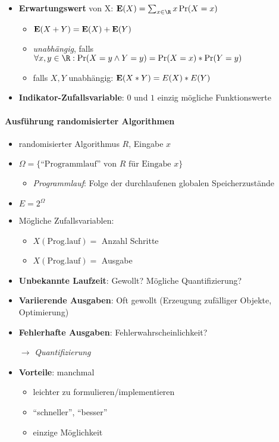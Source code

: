 \begin{itemize}
  \item \textbf{Erwartungswert} von X: $ \E(X) = \sum_{x \in \R}x\Pr(X = x) $
  \begin{itemize}
    \item $ \text{\textbf{E}}(X + Y) = \text{\textbf{E}}(X) + \text{\textbf{E}}(Y) $
    \item \emph{unabhängig}, falls $ \forall x, y \in \R : \Pr(X = y \wedge Y = y) = \Pr(X = x) * \Pr(Y = y) $
    \item falls $ X, Y $ unabhängig: $ \text{\textbf{E}}(X * Y) = E(X) * E(Y) $
  \end{itemize}
  \item \textbf{Indikator-Zufallsvariable}: $ 0 $ und $ 1 $ einzig mögliche Funktionswerte
\end{itemize}

\paragraph{Ausführung randomisierter Algorithmen}
\begin{itemize}
  \item randomisierter Algorithmus $ R $, Eingabe $ x $
  \item $ \Omega = \{ \text{``Programmlauf'' von } R \text{ für Eingabe } x \} $
  \begin{itemize}
    \item \emph{Programmlauf}: Folge der durchlaufenen globalen Speicherzustände
  \end{itemize}
  \item $ E = 2^\Omega $
  \item Mögliche Zufallsvariablen:
  \begin{itemize}
    \item $ X(\text{Prog.lauf}) = $ Anzahl Schritte
    \item $ X(\text{Prog.lauf}) = $ Ausgabe
  \end{itemize}
  \item \textbf{Unbekannte Laufzeit}: Gewollt? Mögliche Quantifizierung?
  \item \textbf{Variierende Ausgaben}: Oft gewollt (Erzeugung zufälliger Objekte, Optimierung)
  \item \textbf{Fehlerhafte Ausgaben}: Fehlerwahrscheinlichkeit?
  \item[$ \to $] \emph{Quantifizierung}
  \item \textbf{Vorteile}: manchmal
  \begin{itemize}
    \item leichter zu formulieren/implementieren
    \item ``schneller'', ``besser''
    \item einzige Möglichkeit
  \end{itemize}
\end{itemize}

